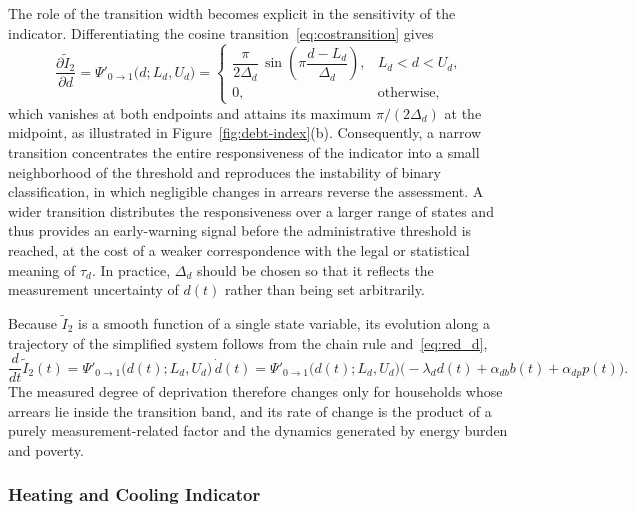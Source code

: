 \documentclass[11pt,a4paper]{article}
\begin{document}
The role of the transition width becomes explicit in the sensitivity of the indicator. Differentiating the cosine transition~\eqref{eq:costransition} gives
\begin{equation}\label{eq:dpsi}
\frac{\partial\widetilde I_2}{\partial d}
=
\Psi'_{0\to1}\bigl(d;L_d,U_d\bigr)
=
\begin{cases}
\dfrac{\pi}{2\Delta_d}\,
\sin\!\left(\pi\dfrac{d-L_d}{\Delta_d}\right), & L_d<d<U_d,\\[10pt]
0, & \text{otherwise},
\end{cases}
\end{equation}
which vanishes at both endpoints and attains its maximum \(\pi/(2\Delta_d)\) at the midpoint, as illustrated in Figure~\ref{fig:debt-index}(b). Consequently, a narrow transition concentrates the entire responsiveness of the indicator into a small neighborhood of the threshold and reproduces the instability of binary classification, in which negligible changes in arrears reverse the assessment. A wider transition distributes the responsiveness over a larger range of states and thus provides an early-warning signal before the administrative threshold is reached, at the cost of a weaker correspondence with the legal or statistical meaning of \(\tau_d\). In practice, \(\Delta_d\) should be chosen so that it reflects the measurement uncertainty of \(d(t)\) rather than being set arbitrarily.

Because \(\widetilde I_2\) is a smooth function of a single state variable, its evolution along a trajectory of the simplified system follows from the chain rule and~\eqref{eq:red_d},
\begin{equation}\label{eq:I2dot}
\frac{d}{dt}\widetilde I_2(t)
=
\Psi'_{0\to1}\bigl(d(t);L_d,U_d\bigr)\,\dot d(t)
=
\Psi'_{0\to1}\bigl(d(t);L_d,U_d\bigr)
\bigl(-\lambda_d d(t)+\alpha_{db}b(t)+\alpha_{dp}p(t)\bigr).
\end{equation}
The measured degree of deprivation therefore changes only for households whose arrears lie inside the transition band, and its rate of change is the product of a purely measurement-related factor and the dynamics generated by energy burden and poverty.


\subsubsection{Heating and Cooling Indicator}\label{sec:heating-cooling}
\end{document}
